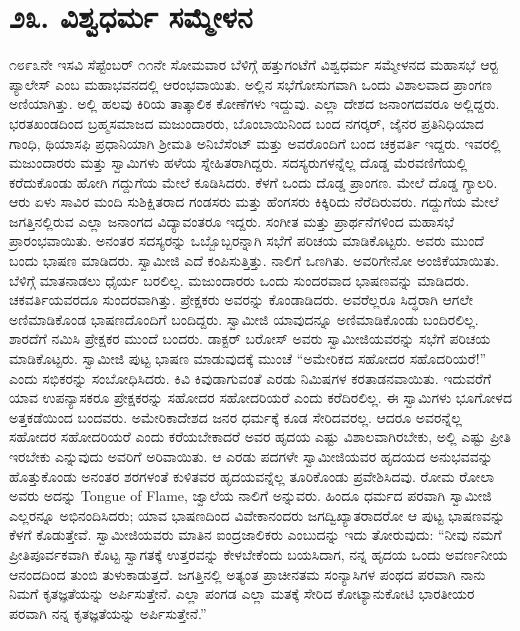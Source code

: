 
\chapter*{೨೩. ವಿಶ್ವಧರ್ಮ ಸಮ್ಮೇಳನ}

೧೮೯೩ನೇ ಇಸವಿ ಸೆಪ್ಟೆಂಬರ್ ೧೧ನೇ ಸೋಮವಾರ ಬೆಳಿಗ್ಗೆ ಹತ್ತುಗಂಟೆಗೆ ವಿಶ್ವಧರ್ಮ ಸಮ್ಮೇಳನದ ಮಹಾಸಭೆ ಆರ‍್ಟ ಪ್ಯಾಲೇಸ್ ಎಂಬ ಮಹಾಭವನದಲ್ಲಿ ಆರಂಭವಾಯಿತು. ಅಲ್ಲಿನ ಸಭೆಗೋಸುಗವಾಗಿ ಒಂದು ವಿಶಾಲವಾದ ಪ್ರಾಂಗಣ ಅಣಿಯಾಗಿತ್ತು. ಅಲ್ಲಿ ಹಲವು ಕಿರಿಯ ತಾತ್ಕಾಲಿಕ ಕೋಣೆಗಳು ಇದ್ದುವು. ಎಲ್ಲಾ ದೇಶದ ಜನಾಂಗದವರೂ ಅಲ್ಲಿದ್ದರು. ಭರತಖಂಡದಿಂದ ಬ್ರಹ್ಮಸಮಾಜದ ಮಜುಂದಾರರು, ಬೊಂಬಾಯಿನಿಂದ ಬಂದ ನಗರ್‍ಕರ್, ಜೈನರ ಪ್ರತಿನಿಧಿಯಾದ ಗಾಂಧಿ, ಥಿಯಾಸಫಿ ಪ್ರಧಾನಿಯಾಗಿ ಶ‍್ರೀಮತಿ ಅನಿಬೆಸೆಂಟ್ ಮತ್ತು ಅವರೊಂದಿಗೆ ಬಂದ ಚಕ್ರವರ್ತಿ ಇದ್ದರು. ಇವರಲ್ಲಿ ಮಜುಂದಾರರು ಮತ್ತು ಸ್ವಾಮಿಗಳು ಹಳೆಯ ಸ್ನೇಹಿತರಾಗಿದ್ದರು. ಸದಸ್ಯರುಗಳನ್ನೆಲ್ಲ ದೊಡ್ಡ ಮೆರವಣಿಗೆಯಲ್ಲಿ ಕರೆದುಕೊಂಡು ಹೋಗಿ ಗದ್ದುಗೆಯ ಮೇಲೆ ಕೂಡಿಸಿದರು. ಕೆಳಗೆ ಒಂದು ದೊಡ್ಡ ಪ್ರಾಂಗಣ. ಮೇಲೆ ದೊಡ್ಡ ಗ್ಯಾಲರಿ. ಆರು ಏಳು ಸಾವಿರ ಮಂದಿ ಸುಶಿಕ್ಷಿತರಾದ ಗಂಡಸರು ಮತ್ತು ಹೆಂಗಸರು ಕಿಕ್ಕಿರಿದು ನೆರೆದಿರುವರು. ಗದ್ದುಗೆಯ ಮೇಲೆ ಜಗತ್ತಿನಲ್ಲಿರುವ ಎಲ್ಲಾ ಜನಾಂಗದ ವಿದ್ಯಾವಂತರೂ ಇದ್ದರು. ಸಂಗೀತ ಮತ್ತು ಪ್ರಾರ್ಥನೆಗಳಿಂದ ಮಹಾಸಭೆ ಪ್ರಾರಂಭವಾಯಿತು. ಅನಂತರ ಸದಸ್ಯರನ್ನು ಒಬ್ಬೊಬ್ಬರನ್ನಾಗಿ ಸಭೆಗೆ ಪರಿಚಯ ಮಾಡಿಕೊಟ್ಟರು. ಅವರು ಮುಂದೆ ಬಂದು ಭಾಷಣ ಮಾಡಿದರು. ಸ್ವಾಮೀಜಿ ಎದೆ ಕಂಪಿಸುತ್ತಿತ್ತು. ನಾಲಿಗೆ ಒಣಗಿತು. ಅವರಿಗೇನೋ ಅಂಜಿಕೆಯಾಯಿತು. ಬೆಳಿಗ್ಗೆ ಮಾತನಾಡಲು ಧೈರ್ಯ ಬರಲಿಲ್ಲ. ಮಜುಂದಾರರು ಒಂದು ಸುಂದರವಾದ ಭಾಷಣವನ್ನು ಮಾಡಿದರು. ಚಕವರ್ತಿಯವರದೂ ಸುಂದರವಾಗಿತ್ತು. ಪ್ರೇಕ್ಷಕರು ಅವರನ್ನು ಕೊಂಡಾಡಿದರು. ಅವರೆಲ್ಲರೂ ಸಿದ್ಧರಾಗಿ ಆಗಲೇ ಅಣಿಮಾಡಿಕೊಂಡ ಭಾಷಣದೊಂದಿಗೆ ಬಂದಿದ್ದರು. ಸ್ವಾಮೀಜಿ ಯಾವುದನ್ನೂ ಅಣಿಮಾಡಿಕೊಂಡು ಬಂದಿರಲಿಲ್ಲ. ಶಾರದೆಗೆ ನಮಿಸಿ ಪ್ರೇಕ್ಷಕರ ಮುಂದೆ ಬಂದರು. ಡಾಕ್ಟರ್ ಬರೋಸ್ ಅವರು ಸ್ವಾಮೀಜಿಯವರನ್ನು ಸಭೆಗೆ ಪರಿಚಯ ಮಾಡಿಕೊಟ್ಟರು. ಸ್ವಾಮೀಜಿ ಪುಟ್ಟ ಭಾಷಣ ಮಾಡುವುದಕ್ಕೆ ಮುಂಚೆ “ಅಮೇರಿಕದ ಸಹೋದರ ಸಹೊದರಿಯರೆ!” ಎಂದು ಸಭಿಕರನ್ನು ಸಂಬೋಧಿಸಿದರು. ಕಿವಿ ಕಿವುಡಾಗುವಂತೆ ಎರಡು ನಿಮಿಷಗಳ ಕರತಾಡನವಾಯಿತು. ಇದುವರೆಗೆ ಯಾವ ಉಪನ್ಯಾಸಕರೂ ಪ್ರೇಕ್ಷಕರನ್ನು ಸಹೋದರ ಸಹೋದರಿಯರೆ ಎಂದು ಕರೆದಿರಲಿಲ್ಲ. ಈ ಸ್ವಾಮಿಗಳು ಭೂಗೋಳದ ಅತ್ತಕಡೆಯಿಂದ ಬಂದವರು. ಅಮೇರಿಕಾದೇಶದ ಜನರ ಧರ್ಮಕ್ಕೆ ಕೂಡ ಸೇರಿದವರಲ್ಲ. ಆದರೂ ಅವರನ್ನೆಲ್ಲ ಸಹೋದರ ಸಹೋದರಿಯರೆ ಎಂದು ಕರೆಯಬೇಕಾದರೆ ಅವರ ಹೃದಯ ಎಷ್ಟು ವಿಶಾಲವಾಗಿರಬೇಕು, ಅಲ್ಲಿ ಎಷ್ಟು ಪ್ರೀತಿ ಇರಬೇಕು ಎನ್ನುವುದು ಅವರಿಗೆ ಅರಿವಾಯಿತು. ಆ ಎರಡು ಪದಗಳೇ ಸ್ವಾಮೀಜಿಯವರ ಹೃದಯದ ಅನುಭವವನ್ನು ಹೊತ್ತುಕೊಂಡು ಅನಂತರ ಶರಗಳಂತೆ ಕುಳಿತವರ ಹೃದಯವನ್ನೆಲ್ಲ ತೂರಿಕೊಂಡು ಪ್ರವೇಶಿಸಿದವು. ರೋಮ ರೋಲಾ ಅವರು ಅದನ್ನು Tongue of Flame, ಜ್ವಾಲೆಯ ನಾಲಿಗೆ ಅನ್ನುವರು. ಹಿಂದೂ ಧರ್ಮದ ಪರವಾಗಿ ಸ್ವಾಮೀಜಿ ಎಲ್ಲರನ್ನೂ ಅಭಿನಂದಿಸಿದರು; ಯಾವ ಭಾಷಣದಿಂದ ವಿವೇಕಾನಂದರು ಜಗದ್ವಿಖ್ಯಾತರಾದರೋ ಆ ಪುಟ್ಟ ಭಾಷಣವನ್ನು ಕೆಳಗೆ ಕೊಡುತ್ತೇವೆ. ಸ್ವಾಮೀಜಿಯವರು ಮಾತಿನ ಐಂದ್ರಜಾಲಿಕರು ಎಂಬುದನ್ನು ಇದು ತೋರುವುದು: “ನೀವು ನಮಗೆ ಪ್ರೀತಿಪೂರ್ವಕವಾಗಿ ಕೊಟ್ಟ ಸ್ವಾಗತಕ್ಕೆ ಉತ್ತರವನ್ನು ಕೇಳಬೇಕೆಂದು ಬಯಸಿದಾಗ, ನನ್ನ ಹೃದಯ ಒಂದು ಅವರ್ಣನೀಯ ಆನಂದದಿಂದ ತುಂಬಿ ತುಳುಕಾಡುತ್ತದೆ. ಜಗತ್ತಿನಲ್ಲಿ ಅತ್ಯಂತ ಪ್ರಾಚೀನತಮ ಸಂನ್ಯಾಸಿಗಳ ಪಂಥದ ಪರವಾಗಿ ನಾನು ನಿಮಗೆ ಕೃತಜ್ಞತೆಯನ್ನು ಅರ್ಪಿಸುತ್ತೇನೆ. ಎಲ್ಲಾ ಪಂಗಡ ಎಲ್ಲಾ ಮತಕ್ಕೆ ಸೇರಿದ ಕೋಟ್ಯಾನುಕೋಟಿ ಭಾರತೀಯರ ಪರವಾಗಿ ನನ್ನ ಕೃತಜ್ಞತೆಯನ್ನು ಅರ್ಪಿಸುತ್ತೇನೆ.” 

